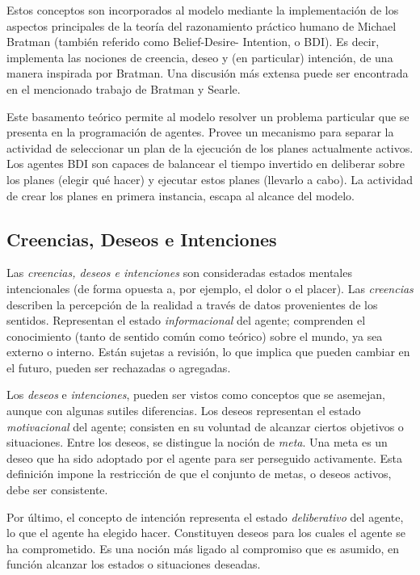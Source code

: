  Estos conceptos son incorporados al modelo mediante la implementación
 de los  aspectos principales de la teoría del razonamiento práctico
 humano de Michael Bratman (también referido como Belief-Desire-
 Intention, o BDI).
 Es decir, implementa  las nociones de creencia, deseo y (en
 particular) intención, de una manera inspirada  por Bratman.
 Una discusión más extensa puede ser encontrada en el mencionado
 trabajo de Bratman\cite{brat99} y Searle\cite{searle1985}.
 
 Este basamento teórico permite al modelo resolver un problema
 particular que  se presenta en la programación de agentes.
 Provee un mecanismo para separar la  actividad de seleccionar un plan
 de la ejecución de los planes actualmente activos.
 Los agentes BDI son capaces de balancear el tiempo invertido en
 deliberar sobre los planes (elegir qué hacer) y ejecutar estos planes
 (llevarlo a cabo).
 La actividad  de crear los planes en primera instancia, escapa al
 alcance del modelo.

\subsection{Creencias, Deseos e Intenciones}
\label{sub:creencia_deseos_intenciones}
 
 Las \textit{creencias, deseos e intenciones} son consideradas estados
 mentales  intencionales (de forma opuesta a, por ejemplo, el dolor o
 el placer).
 Las \textit{creencias}  describen la percepción de la realidad a
 través de datos provenientes de  los sentidos.
 Representan el estado \textit{informacional} del agente; comprenden el
 conocimiento (tanto de sentido común como teórico) sobre el mundo, ya
 sea  externo o interno.
 Están sujetas a revisión, lo que implica que pueden  cambiar en el
 futuro, pueden ser rechazadas o agregadas.
 
 Los \textit{deseos} e \textit{intenciones}, pueden ser vistos como
 conceptos que  se asemejan, aunque con algunas sutiles diferencias.
 Los deseos representan el  estado \textit{motivacional} del agente;
 consisten en su voluntad de alcanzar  ciertos objetivos o situaciones.
 Entre los deseos, se distingue la noción de  \textit{meta}.
 Una meta es un deseo que ha sido adoptado por el agente para  ser
 perseguido activamente.
 Esta definición impone la restricción de que el  conjunto de metas, o
 deseos activos, debe ser consistente.
 
 Por último, el concepto de intención representa el estado
 \textit{deliberativo} del agente, lo que el agente ha elegido hacer.
 Constituyen deseos para los cuales el agente se ha comprometido.
 Es una noción más ligado al compromiso que es  asumido, en función
 alcanzar los estados o situaciones deseadas.

